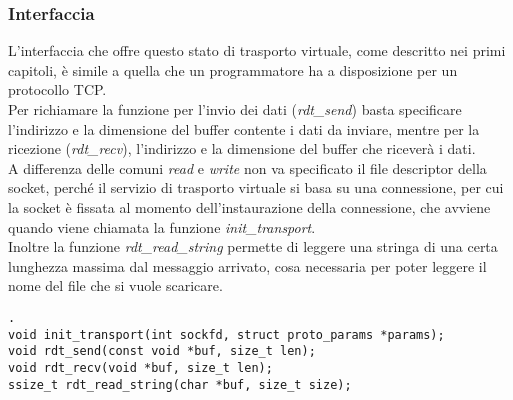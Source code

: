 \subsubsection{Interfaccia}
L'interfaccia che offre questo stato di trasporto virtuale, come descritto nei primi capitoli,
è simile a quella che un programmatore ha a disposizione per un protocollo TCP.\\
Per richiamare la funzione per l'invio dei dati (\emph{rdt\_send}) basta specificare l'indirizzo
e la dimensione del buffer contente i dati da inviare, mentre per la ricezione (\emph{rdt\_recv}), 
l'indirizzo e la dimensione del buffer che riceverà i dati.\\
A differenza delle comuni \emph{read} e \emph{write} non va specificato il file descriptor della 
socket, perché il servizio di trasporto virtuale si basa su una connessione, per cui la socket è 
fissata al momento dell'instaurazione della connessione, che avviene quando viene chiamata la 
funzione \emph{init\_transport}.\\
Inoltre la funzione \emph{rdt\_read\_string} permette di leggere una stringa di una certa 
lunghezza massima dal messaggio arrivato, cosa necessaria per poter leggere il nome del file che 
si vuole scaricare.

\begin{lstlisting}[title=transport.h].
void init_transport(int sockfd, struct proto_params *params);
void rdt_send(const void *buf, size_t len);
void rdt_recv(void *buf, size_t len);
ssize_t rdt_read_string(char *buf, size_t size);
\end{lstlisting}
